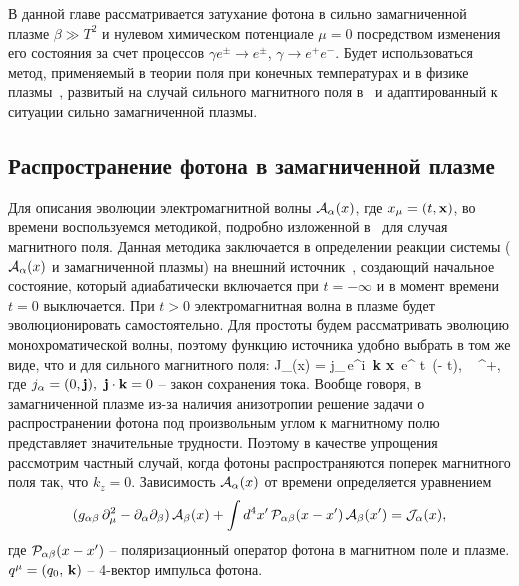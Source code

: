 В данной главе рассматривается затухание фотона в сильно замагниченной плазме $\beta \gg T^2$
 и нулевом химическом потенциале $\mu = 0$ посредством изменения его состояния за счет процессов $\gamma e^\pm\to e^\pm$, $\gamma \to e^+e^-$. Будет использоваться метод, применяемый в теории поля при конечных температурах и в физике плазмы~\cite{Boyan}, развитый на случай сильного магнитного поля в~\cite{MikhChist:2001} и адаптированный к ситуации сильно замагниченной плазмы.

\subsection{Распространение фотона в замагниченной плазме}

Для описания эволюции электромагнитной волны ${\cal A}_{\alpha}(x)$, где $x_\mu = (t, {\bf x})$, 
во времени воспользуемся методикой, подробно изложенной в~\cite{MikhChist:2001} для случая магнитного поля. Данная методика заключается в определении реакции системы 
(${\cal A}_{\alpha}(x)$ и замагниченной плазмы) на внешний источник~\cite{Kirzhnits:1987}, создающий начальное состояние, который адиабатически включается 
при $t = - \infty$ и в момент времени $t = 0$ выключается. При $t > 0$
электромагнитная волна в плазме будет эволюционировать самостоятельно. Для простоты будем рассматривать эволюцию монохроматической волны, поэтому 
функцию источника удобно выбрать в том же виде, что и для сильного магнитного поля:
%
\beq
{\cal J}_{\alpha}(x) = j_{\alpha}\,e^{i \,{\bf k} {\bf x}}\,
e^{ \varepsilon t}\, \theta(- t), \,\,\, \varepsilon {}^+,
\label{eq:1}
\eeq
где $j_{\alpha} = (0, {\bf j}),\,\,{\bf j} \cdot {\bf k} = 0$ – закон сохранения тока. Вообще говоря, в замагниченной плазме из-за наличия анизотропии решение задачи о распространении фотона под произвольным углом к магнитному полю представляет значительные трудности. Поэтому в качестве упрощения рассмотрим частный случай, когда фотоны распространяются поперек магнитного поля так, что $k_z=0$. Зависимость ${\cal A}_{\alpha}(x)$ от времени  определяется уравнением
%
\begin{eqnarray}\label{eq:WaveEq}
(g_{\alpha \beta} \, \partial_{\mu}^2  -
\partial_{\alpha}\partial_{\beta}) \, {\cal A}_{\beta}(x) + 
\int d^4 x'\, {\cal P}_{\alpha \beta} (x - x') \, {\cal A}_{\beta}(x')
= {\cal J}_{\alpha}(x),
\label{eq:2}
\end{eqnarray}
где ${\cal P}_{\alpha \beta} (x - x')$ -- поляризационный оператор фотона в магнитном поле и плазме. $q^{\mu} = (q_0,\, {\bf k})$ -- 4-вектор импульса фотона.

